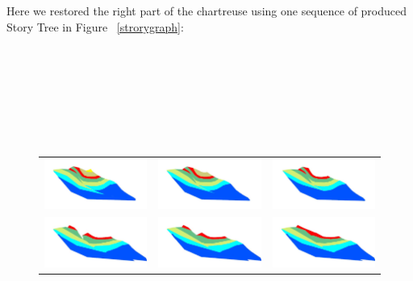 \documentclass[12pt, a4paper]{report} %
\begin{document}
Here we restored the right part of the chartreuse using one sequence of produced Story Tree in Figure ~\ref{strorygraph}:\\\\
\\\\
\\\\
\\\\
\begin{center}
\begin{figure}[htb]
\centering
\begin{tabular}{@{}ccc@{}}
\includegraphics[width=.34\textwidth]{chartreusedroite0.png}&
\includegraphics[width=.34\textwidth]{chartreusedroite1.png}&
\includegraphics[width=.34\textwidth]{chartreusedroite2.png}\\
\includegraphics[width=.34\textwidth]{chartreusedroite3.png}&
\includegraphics[width=.34\textwidth]{chartreusedroite4.png}&
\includegraphics[width=.34\textwidth]{chartreusedroite5.png}\\

\end{tabular}
\end{figure}
\end{center}
\end{document}
